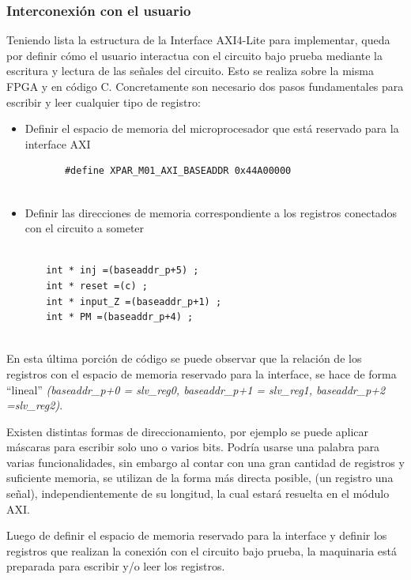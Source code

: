 \documentclass[a4paper,openright,12pt]{report}
\begin{document}
    \subsubsection{Interconexión con el usuario}
    
    Teniendo lista la estructura de la Interface AXI4-Lite para implementar, queda por definir cómo el usuario interactua con el circuito bajo prueba mediante la escritura y  lectura de las señales del circuito. Esto se realiza  sobre la misma FPGA y en código C. 
Concretamente son necesario dos pasos fundamentales para  escribir y leer cualquier tipo de registro:
    \begin{itemize}
    \item Definir el espacio de memoria del microprocesador que está reservado para la interface AXI
     \begin{lstlisting}
       #define XPAR_M01_AXI_BASEADDR 0x44A00000
      
      \end{lstlisting}
      
      
     \item Definir las direcciones de memoria correspondiente a los registros conectados con el circuito a someter 
    \end{itemize}
    
      \begin{lstlisting}
      
       int * inj =(baseaddr_p+5) ;
       int * reset =(c) ;
       int * input_Z =(baseaddr_p+1) ;
       int * PM =(baseaddr_p+4) ;
      
      \end{lstlisting}
      En esta última porción de código se puede observar que la relación de los  registros con el espacio de memoria reservado para la interface, se hace de forma ``lineal'' \textit{(baseaddr\_p+0 = slv\_reg0, baseaddr\_p+1 = slv\_reg1, baseaddr\_p+2 =slv\_reg2)}. 
      
 Existen distintas formas de direccionamiento, por ejemplo se puede aplicar máscaras para escribir solo uno o varios bits. Podría usarse una palabra para varias funcionalidades, sin embargo al contar con una gran cantidad de registros y suficiente memoria, se utilizan de la forma más directa posible, (un registro una señal), independientemente de su longitud, la cual estará resuelta en el módulo AXI.    
 
      Luego de  definir el espacio de memoria reservado para la interface y definir los registros que realizan la conexión con el circuito bajo prueba, la maquinaria está preparada para escribir y/o leer los registros.
      
\end{document}
